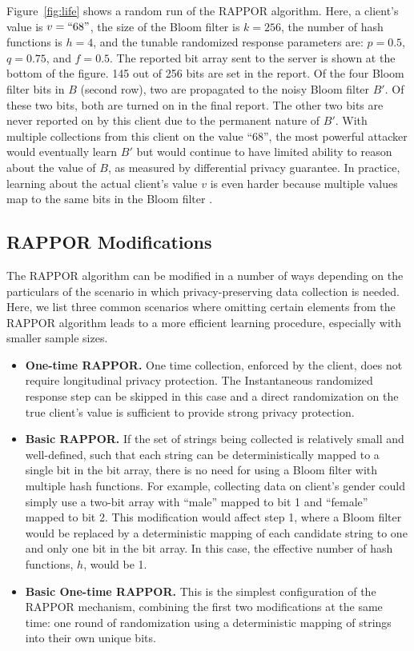 \documentclass{sig-alternate-2013}
\newcommand\RAPPOR{{RAPPOR}}
\begin{document}
Figure~\ref{fig:life} shows a random run of the \RAPPOR{} algorithm. Here, a client's value is $v = ``68"$, the size of the Bloom filter is $k = 256$, the number of hash functions is $h = 4$, and the tunable randomized response parameters are: $p = 0.5$, $q = 0.75$, and $f = 0.5$. The reported bit array sent to the server is shown at the bottom of the figure. 145 out of 256 bits are set in the report. Of the four Bloom filter bits in $B$ (second row), two are propagated to the noisy Bloom filter $B'$. Of these two bits, both are turned on in the final report. The other two bits are never reported on by this client due to the permanent nature of $B'$. With multiple collections from this client on the value ``68'', the most powerful attacker would eventually learn $B'$ but would continue to have limited ability to reason about the value of $B$, as measured by differential privacy guarantee. In practice, learning about the actual client's value $v$ is even harder because multiple values map to the same bits in the Bloom filter \citep{bloom_privacy}.

\subsection{\RAPPOR{} Modifications}
The \RAPPOR{} algorithm can be modified in a number of ways depending on the particulars of the scenario in which privacy-preserving data collection is needed. Here, we list three common scenarios where omitting certain elements from the \RAPPOR{} algorithm leads to a more efficient learning procedure, especially with smaller sample sizes. 
\begin{itemize}
\item {\bf One-time \RAPPOR{}.} One time collection, enforced by the client, does not require longitudinal privacy protection. The Instantaneous randomized response step can be skipped in this case and a direct randomization on the true client's value is sufficient to provide strong privacy protection. 
\item {\bf Basic \RAPPOR{}.} If the set of strings being collected is relatively small and well-defined, such that each string can be deterministically mapped to a single bit in the bit array, there is no need for using a Bloom filter with multiple hash functions. For example, collecting data on client's gender could simply use a two-bit array with ``male'' mapped to bit 1 and ``female'' mapped to bit 2. This modification would affect step 1, where a Bloom filter would be replaced by a deterministic mapping of each candidate string to one and only one bit in the bit array. In this case, the effective number of hash functions, $h$, would be 1.
\item {\bf Basic One-time \RAPPOR{}.} This is the simplest configuration of the \RAPPOR{} mechanism, combining the first two modifications at the same time: one round of randomization using a deterministic mapping of strings into their own unique bits.
\end{itemize}
\end{document}

